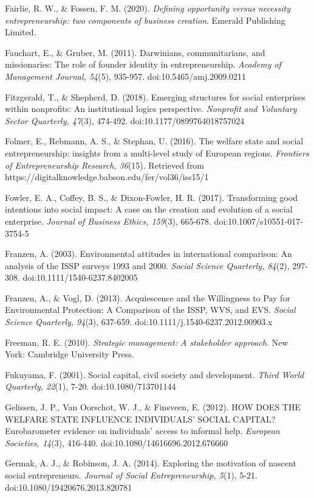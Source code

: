 \documentclass{article}
\begin{document}
Fairlie, R. W., \& Fossen, F. M. (2020). \emph{Defining opportunity versus necessity entrepreneurship: two components of business creation}. Emerald Publishing Limited.

Fauchart, E., \& Gruber, M. (2011). Darwinians, communitarians, and missionaries: The role of founder identity in entrepreneurship. \emph{Academy of Management Journal, 54}(5), 935-957. doi:10.5465/amj.2009.0211

Fitzgerald, T., \& Shepherd, D. (2018). Emerging structures for social enterprises within nonprofits: An institutional logics perspective. \emph{Nonprofit}\emph{ and Voluntary Sector Quarterly, 47}(3), 474-492. doi:10.1177/0899764018757024

Folmer, E., Rebmann, A. S., \& Stephan, U. (2016). The welfare state and social entrepreneurship: insights from a multi-level study of European regions. \emph{Frontiers of Entrepreneurship Research, 36}(15). Retrieved from https://digitalknowledge.babson.edu/fer/vol36/iss15/1

Fowler, E. A., Coffey, B. S., \& Dixon-Fowler, H. R. (2017). Transforming good intentions into social impact: A case on the creation and evolution of a social enterprise. \emph{Journal of Business Ethics, 159}(3), 665-678. doi:10.1007/s10551-017-3754-5

Franzen, A. (2003). Environmental attitudes in international comparison: An analysis of the ISSP surveys 1993 and 2000. \emph{Social Science Quarterly, 84}(2), 297-308. doi:10.1111/1540-6237.8402005

Franzen, A., \& Vogl, D. (2013). Acquiescence and the Willingness to Pay for Environmental Protection: A Comparison of the ISSP, WVS, and EVS. \emph{Social Science Quarterly, 94}(3), 637-659. doi:10.1111/j.1540-6237.2012.00903.x

Freeman, R. E. (2010). \emph{Strategic management: A stakeholder approach}. New York: Cambridge University Press.

Fukuyama, F. (2001). Social capital, civil society and development. \emph{Third World Quarterly, 22}(1), 7-20. doi:10.1080/713701144

Gelissen, J. P., Van Oorschot, W. J., \& Finsveen, E. (2012). HOW DOES THE WELFARE STATE INFLUENCE INDIVIDUALS' SOCIAL CAPITAL? Eurobarometer evidence on individuals' access to informal help. \emph{European Societies, 14}(3), 416-440. doi:10.1080/14616696.2012.676660

Germak, A. J., \& Robinson, J. A. (2014). Exploring the motivation of nascent social entrepreneurs. \emph{Journal of Social Entrepreneurship, 5}(1), 5-21. doi:10.1080/19420676.2013.820781
\end{document}
